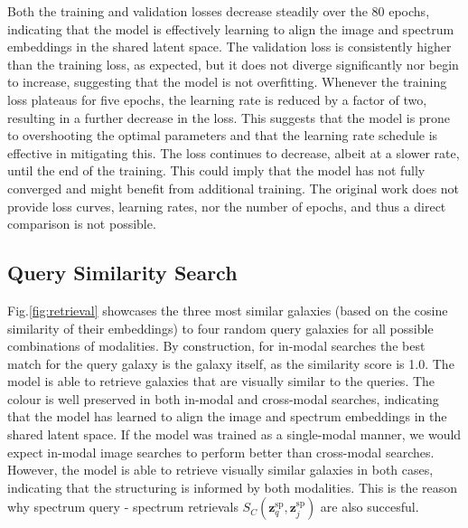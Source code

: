\documentclass[a4paper,12pt]{article}
\begin{document}
Both the training and validation losses decrease steadily over the 80 epochs, indicating that the model is effectively learning to align the image and spectrum embeddings in the shared latent space. The validation loss is consistently higher than the training loss, as expected, but it does not diverge significantly nor begin to increase, suggesting that the model is not overfitting. Whenever the training loss plateaus for five epochs, the learning rate is reduced by a factor of two, resulting in a further decrease in the loss. This suggests that the model is prone to overshooting the optimal parameters and that the learning rate schedule is effective in mitigating this. The loss continues to decrease, albeit at a slower rate, until the end of the training. This could imply that the model has not fully converged and might benefit from additional training. The original work does not provide loss curves, learning rates, nor the number of epochs, and thus a direct comparison is not possible.









\subsection{Query Similarity Search}
Fig.\ref{fig:retrieval} showcases the three most similar galaxies (based on the cosine similarity of their embeddings) to four random query galaxies for all possible combinations of modalities. By construction, for in-modal searches the best match for the query galaxy is the galaxy itself, as the similarity score is 1.0. The model is able to retrieve galaxies that are visually similar to the queries. The colour is well preserved in both in-modal and cross-modal searches, indicating that the model has learned to align the image and spectrum embeddings in the shared latent space. If the model was trained as a single-modal manner, we would expect in-modal image searches to perform better than cross-modal searches. However, the model is able to retrieve visually similar galaxies in both cases, indicating that the structuring is informed by both modalities.  This is the reason why spectrum query - spectrum retrievals $S_C(\mathbf{z}^{\text{sp}}_q, \mathbf{z}^{\text{sp}}_j)$ are also succesful. 
\end{document}
